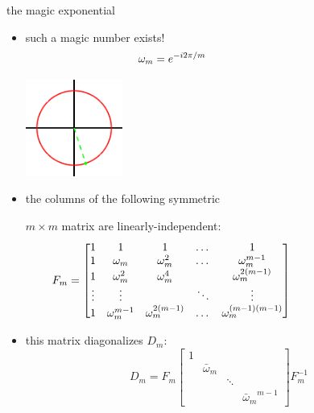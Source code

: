 \documentclass[10pt,
               svgnames,
               hyperref={colorlinks,citecolor=DeepPink4,linkcolor=FireBrick,urlcolor=Maroon},
               usepdftitle=false]{beamer}
\begin{document}
\begin{frame}{the magic exponential}

\begin{itemize}
\item such a magic number exists!
{\large
    $$\omega_m = e^{-i 2\pi/m} \hspace{30mm}$$
}

\vspace{-15mm}
\hfill \includegraphics[width=0.25\textwidth]{images/magic5.png}

\vspace{-15mm}
\item the columns of the following symmetric 

$m\times m$ matrix are linearly-independent:
  $$F_m = \begin{bmatrix} 1 & 1 & 1 & \dots & 1 \\ 1 & \omega_m & \omega_m^2 & \dots & \omega_m^{m-1} \\ 1 & \omega_m^2 & \omega_m^4 &  & \omega_m^{2(m-1)} \\ \vdots & \vdots & & \ddots & \vdots \\ 1 & \omega_m^{m-1} & \omega_m^{2(m-1)} & \dots & \omega_m^{(m-1)(m-1)} \end{bmatrix} \hspace{30mm}$$
\item this matrix diagonalizes $D_m$:
    $$D_m = F_m \begin{bmatrix} 1 & & & \\ & \bar\omega_m & & \\ & & \ddots & \\ & & & {\bar\omega_m}^{m-1} \end{bmatrix} F_m^{-1}$$
\end{itemize}
\end{frame}
\end{document}
